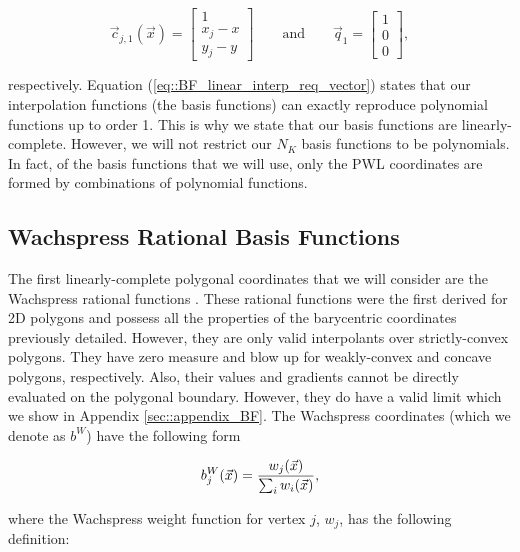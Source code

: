 \begin{equation}
\vec{c}_{j,1}(\vec{x}) = \left[
\begin{array}{c}
1 \\
x_j - x \\
y_j - y
\end{array} \right]
  \qquad \text{and} \qquad \vec{q}_1 = \left[
\begin{array}{c}
1 \\
0 \\
0
\end{array} \right],
\label{eq::BF_linear_constraint_terms}
\end{equation}

\noindent respectively. Equation (\ref{eq::BF_linear_interp_req_vector}) states that our interpolation functions (the basis functions) can exactly reproduce polynomial functions up to order 1. This is why we state that our basis functions are linearly-complete. However, we will not restrict our $N_K$ basis functions to be polynomials. In fact, of the basis functions that we will use, only the PWL coordinates are formed by combinations of polynomial functions.


\subsection{Wachspress Rational Basis Functions}
\label{sec::BF_2DLinear_Wachspress}

The first linearly-complete polygonal coordinates that we will consider are the Wachspress rational functions \cite{wachspress1975rational}. These rational functions were the first derived for 2D polygons and possess all the properties of the barycentric coordinates previously detailed. However, they are only valid interpolants over strictly-convex polygons. They have zero measure and blow up for weakly-convex and concave polygons, respectively. Also, their values and gradients cannot be directly evaluated on the polygonal boundary. However, they do have a valid limit which we show in Appendix \ref{sec::appendix_BF}. The Wachspress coordinates (which we denote as $b^W$) have the following form

\begin{equation}
\label{eq::BF_wach_BF}
b_{j}^{W} (\vec{x}) = \frac{w_j (\vec{x}) }{\sum\displaylimits_{i} w_i (\vec{x})},
\end{equation}

\noindent where the Wachspress weight function for vertex $j$, $w_j$, has the following definition:

